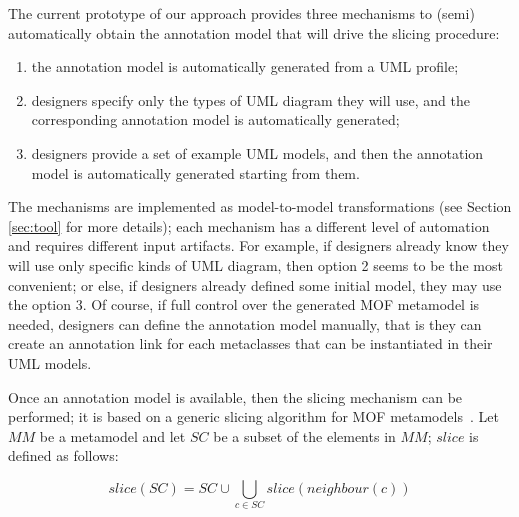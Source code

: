 The current prototype of our approach provides three mechanisms to (semi) automatically obtain the annotation model that will drive the slicing procedure:

\begin{enumerate}
	\item the annotation model is automatically generated from a UML profile;
	\item designers specify only the types of UML diagram they will use, and the corresponding annotation model is automatically generated;
	\item designers provide a set of example UML models, and then the annotation model is automatically generated starting from them.
\end{enumerate}

The mechanisms are implemented as model-to-model transformations (see Section \ref{sec:tool} for more details);
each mechanism has a different level of automation and requires different input artifacts.
For example, if designers already know they will use only specific kinds of UML diagram, then option 2 seems to be the most convenient;
or else, if designers already defined some initial model, they may use the option 3.
Of course, if full control over the generated MOF metamodel is needed, designers can define the annotation model manually, that is they can create an annotation link for each metaclasses that can be instantiated in their UML models.

Once an annotation model is available, then the slicing mechanism can be performed;
it is based on a generic slicing algorithm for MOF metamodels~\cite{ICSEbyadl}. Let
$MM$ be a metamodel and let $SC$ be a subset of the elements in
$MM$; $slice$ is defined as follows:

\vspace{-.2cm}
$$slice(SC)=SC \cup \displaystyle\bigcup_{c \in
SC}{slice(neighbour(c))}$$
\vspace{-.2cm}

